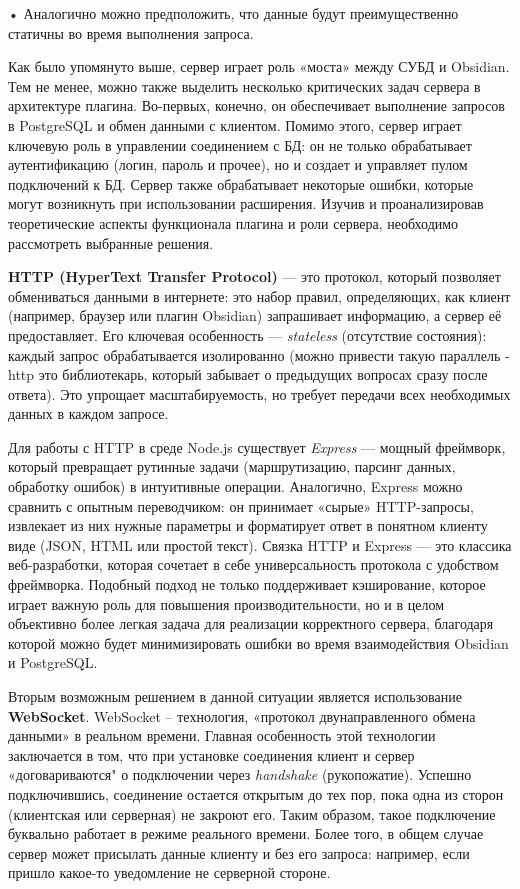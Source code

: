 \documentclass[14pt]{extarticle}
\begin{document}
	• Аналогично можно предположить, что данные будут преимущественно статичны во время выполнения запроса.
	\vspace{0.5em}
	
	Как было упомянуто выше, сервер играет роль «моста» между СУБД и Obsidian. Тем не менее, можно также выделить несколько критических задач сервера в архитектуре плагина. Во-первых, конечно, он обеспечивает выполнение запросов в PostgreSQL и обмен данными с клиентом. Помимо этого, сервер играет ключевую роль в управлении соединением с БД: он не только обрабатывает аутентификацию (логин, пароль и прочее), но и создает и управляет пулом подключений к БД. Сервер также обрабатывает некоторые ошибки, которые могут возникнуть при использовании расширения. Изучив и проанализировав теоретические аспекты функционала плагина и роли сервера, необходимо рассмотреть выбранные решения.
	\vspace{1em}
	
	\textbf{HTTP (HyperText Transfer Protocol)} — это протокол, который позволяет обмениваться данными в интернете: это набор правил, определяющих, как клиент (например, браузер или плагин Obsidian) запрашивает информацию, а сервер её предоставляет. Его ключевая особенность — \textit{stateless} (отсутствие состояния): каждый запрос обрабатывается изолированно (можно привести такую параллель - http это библиотекарь, который забывает о предыдущих вопросах сразу после ответа). Это упрощает масштабируемость, но требует передачи всех необходимых данных в каждом запросе.
	
	Для работы с HTTP в среде Node.js существует \textit{Express} — мощный фреймворк, который превращает рутинные задачи (маршрутизацию, парсинг данных, обработку ошибок) в интуитивные операции. Аналогично, Express можно сравнить с опытным переводчиком: он принимает «сырые» HTTP-запросы, извлекает из них нужные параметры и форматирует ответ в понятном клиенту виде (JSON, HTML или простой текст). Связка HTTP и Express — это классика веб-разработки, которая сочетает в себе универсальность протокола с удобством фреймворка. Подобный подход не только поддерживает кэширование, которое играет важную роль для повышения производительности, но и в целом объективно более легкая задача для реализации корректного сервера, благодаря которой можно будет минимизировать ошибки во время взаимодействия Obsidian и PostgreSQL.
	\vspace{1em}
	
	Вторым возможным решением в данной ситуации является использование \textbf{WebSocket}. WebSocket – технология, «протокол двунаправленного обмена данными» \cite{ws} в реальном времени. Главная особенность этой технологии заключается в том, что при установке соединения клиент и сервер «договариваются" о подключении через \textit{handshake} (рукопожатие). Успешно подключившись, соединение остается открытым до тех пор, пока одна из сторон (клиентская или серверная) не закроют его. Таким образом, такое подключение буквально работает в режиме реального времени. Более того, в общем случае сервер может присылать данные клиенту и без его запроса: например, если пришло какое-то уведомление не серверной стороне. 
	
\end{document}
